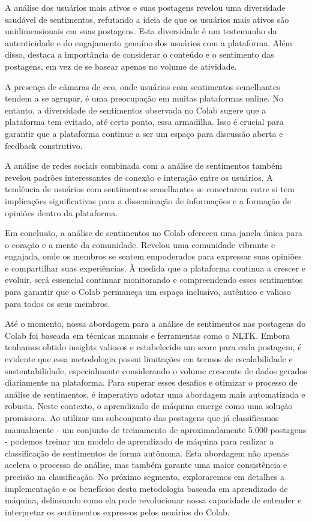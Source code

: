 A análise dos usuários mais ativos e suas postagens revelou uma diversidade saudável de sentimentos, refutando a ideia de que os usuários mais ativos são unidimensionais em suas postagens. Esta diversidade é um testemunho da autenticidade e do engajamento genuíno dos usuários com a plataforma. Além disso, destaca a importância de considerar o conteúdo e o sentimento das postagens, em vez de se basear apenas no volume de atividade.

A presença de câmaras de eco, onde usuários com sentimentos semelhantes tendem a se agrupar, é uma preocupação em muitas plataformas online. No entanto, a diversidade de sentimentos observada no Colab sugere que a plataforma tem evitado, até certo ponto, essa armadilha. Isso é crucial para garantir que a plataforma continue a ser um espaço para discussão aberta e feedback construtivo.

A análise de redes sociais combinada com a análise de sentimentos também revelou padrões interessantes de conexão e interação entre os usuários. A tendência de usuários com sentimentos semelhantes se conectarem entre si tem implicações significativas para a disseminação de informações e a formação de opiniões dentro da plataforma.

Em conclusão, a análise de sentimentos no Colab ofereceu uma janela única para o coração e a mente da comunidade. Revelou uma comunidade vibrante e engajada, onde os membros se sentem empoderados para expressar suas opiniões e compartilhar suas experiências. À medida que a plataforma continua a crescer e evoluir, será essencial continuar monitorando e compreendendo esses sentimentos para garantir que o Colab permaneça um espaço inclusivo, autêntico e valioso para todos os seus membros.

Até o momento, nossa abordagem para a análise de sentimentos nas postagens do Colab foi baseada em técnicas manuais e ferramentas como o NLTK. Embora tenhamos obtido insights valiosos e estabelecido um score para cada postagem, é evidente que essa metodologia possui limitações em termos de escalabilidade e sustentabilidade, especialmente considerando o volume crescente de dados gerados diariamente na plataforma. Para superar esses desafios e otimizar o processo de análise de sentimentos, é imperativo adotar uma abordagem mais automatizada e robusta. Neste contexto, o aprendizado de máquina emerge como uma solução promissora. Ao utilizar um subconjunto das postagens que já classificamos manualmente - um conjunto de treinamento de aproximadamente 5.000 postagens - podemos treinar um modelo de aprendizado de máquina para realizar a classificação de sentimentos de forma autônoma. Esta abordagem não apenas acelera o processo de análise, mas também garante uma maior consistência e precisão na classificação. No próximo segmento, exploraremos em detalhes a implementação e os benefícios desta metodologia baseada em aprendizado de máquina, delineando como ela pode revolucionar nossa capacidade de entender e interpretar os sentimentos expressos pelos usuários do Colab.

